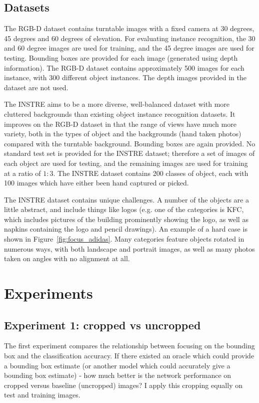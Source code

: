 \subsection{Datasets}

The RGB-D \cite{Lai2011} dataset contains turntable images with a fixed camera at 30 degrees, 45 degrees and 60 degrees of elevation. For evaluating instance recognition, the 30 and 60 degree images are used for training, and the 45 degree images are used for testing. Bounding boxes are provided for each image (generated using depth information). The RGB-D dataset contains approximately 500 images for each instance, with 300 different object instances.  The depth images provided in the dataset are not used.

The INSTRE \cite{Wang2015} aims to be a more diverse, well-balanced dataset with more cluttered backgrounds than existing object instance recognition datasets. It improves on the RGB-D dataset in that the range of views have much more variety, both in the types of object and the backgrounds (hand taken photos) compared with the turntable background. Bounding boxes are again provided. No standard test set is provided for the INSTRE dataset; therefore a set of images of each object are used for testing, and the remaining images are used for training at a ratio of $1:3$. The INSTRE dataset contains 200 classes of object, each with 100 images which have either been hand captured or picked. 

The INSTRE dataset contains unique challenges. A number of the objects are a little abstract, and include things like logos (e.g. one of the categories is KFC, which includes pictures of the building prominently showing the logo, as well as napkins containing the logo and pencil drawings). An example of a hard case is shown in Figure~\ref{fig:focus_adidas}. Many categories feature objects rotated in numerous ways, with both landscape and portrait images, as well as many photos taken on angles with no alignment at all.

\section {Experiments}


\subsection {Experiment 1: cropped vs uncropped}

The first experiment compares the relationship between focusing on the bounding box and the classification accuracy. If there existed an oracle which could provide a bounding box estimate (or another model which could accurately give a bounding box estimate) - how much better is the network performance on cropped versus baseline (uncropped) images? I apply this cropping equally on test and training images.

